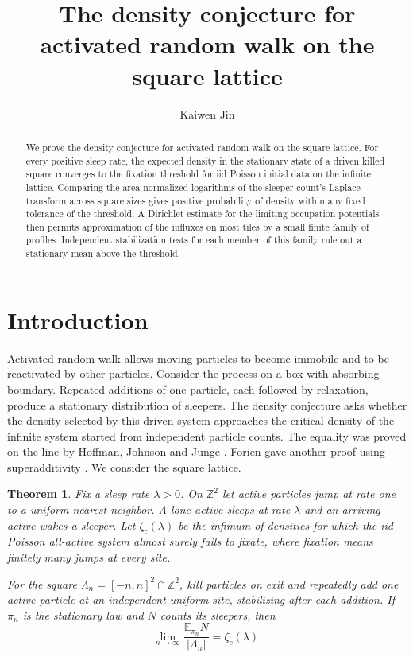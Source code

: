 \documentclass[11pt]{amsart}
\author{Kaiwen Jin}
\title[Stationary density of activated random walk]{The density conjecture for activated random walk on the square lattice}
\newtheorem{theorem}{Theorem}
\newcommand{\Z}{\mathbb Z}
\newcommand{\E}{\mathbb E}
\newcommand{\1}{\mathbf 1}
\begin{document}
\begin{abstract}
We prove the density conjecture for activated random walk on the square lattice. For every positive sleep rate, the expected density in the stationary state of a driven killed square converges to the fixation threshold for iid Poisson initial data on the infinite lattice. Comparing the area-normalized logarithms of the sleeper count's Laplace transform across square sizes gives positive probability of density within any fixed tolerance of the threshold. A Dirichlet estimate for the limiting occupation potentials then permits approximation of the influxes on most tiles by a small finite family of profiles. Independent stabilization tests for each member of this family rule out a stationary mean above the threshold.
\end{abstract}
\maketitle
\section{Introduction}

Activated random walk allows moving particles to become immobile and to be reactivated by other particles. Consider the process on a box with absorbing boundary. Repeated additions of one particle, each followed by relaxation, produce a stationary distribution of sleepers. The density conjecture asks whether the density selected by this driven system approaches the critical density of the infinite system started from independent particle counts. The equality was proved on the line by Hoffman, Johnson and Junge \cite{HJJ}. Forien gave another proof using superadditivity \cite{Forien}. We consider the square lattice.

\begin{theorem}\label{t:main}
 Fix a sleep rate \(\lambda>0\). On \(\Z^2\) let active particles jump at rate one to a uniform nearest neighbor. A lone active sleeps at rate \(\lambda\) and an arriving active wakes a sleeper. Let \(\zeta_c(\lambda)\) be the infimum of densities for which the iid Poisson all-active system almost surely fails to fixate, where fixation means finitely many jumps at every site.

 For the square \(\Lambda_n=[-n,n]^2\cap\Z^2\), kill particles on exit and repeatedly add one active particle at an independent uniform site, stabilizing after each addition. If \(\pi_n\) is the stationary law and \(N\) counts its sleepers, then
 \[
 \lim_{n\to\infty}\frac{\E_{\pi_n} N}{|\Lambda_n|}=\zeta_c(\lambda).
 \]
\end{theorem}
\end{document}

